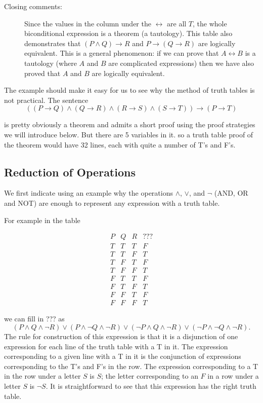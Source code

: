\documentclass[12pt]{article}
\begin{document}
\begin{description}
\item[Closing comments:]  Since the values in the column under the $\leftrightarrow$ are all $T$, the whole biconditional expression is a theorem (a tautology).  This table also demonstrates that $(P \wedge Q) \rightarrow R$ and $P \rightarrow (Q \rightarrow R)$ are logically equivalent.  This is a general phenomenon:  if we can prove that $A \leftrightarrow B$ is a tautology (where $A$ and $B$ are complicated expressions) then we have also proved that $A$ and $B$ are logically equivalent.

\end{description}

The example should make it easy for us to see why the method of truth tables is not practical.  The sentence $$((P \rightarrow Q) \wedge (Q \rightarrow R) \wedge (R \rightarrow S) \wedge (S \rightarrow T)) \rightarrow (P \rightarrow T)$$

is pretty obviously a theorem and admits a short proof using the proof strategies we will introduce below.  But there are 5 variables in it.
so a truth table proof of the theorem would have 32 lines, each with quite a number of T's and F's.

\subsection{Reduction of Operations}

We first indicate using an example why the operations $\wedge$, $\vee$, and $\neg$ (AND, OR and NOT) are enough to represent any expression with a truth table.

For example in the table

$$\begin{array}{ccc|c}

P & Q & R & ??? \\ \hline
T & T & T &    F   \\
T & T & F &    T  \\
T & F & T &    F     \\
T & F & F &    T   \\
F & T & T &    F     \\
F & T & F &    T    \\
F & F & T &    F     \\
F & F & F &    T   
\end{array}$$


we can fill in ??? as $$(P \wedge Q \wedge \neg R) \vee (P \wedge \neg Q \wedge \neg R) \vee (\neg P \wedge Q \wedge \neg R) \vee (\neg P \wedge \neg Q \wedge \neg R).$$  The rule for construction of this expression is that it is a disjunction of one expression for each line of the truth table with a T in it.  The expression corresponding to a given line with a T in it is the conjunction of expressions corresponding to the T's
and F's in the row.  The expression corresponding to a T in the row under a letter $S$ is $S$; the letter corresponding to an $F$ in a row under a letter $S$ is $\neg S$.  It is straightforward to see that this expression has the right truth table.
\end{document}
